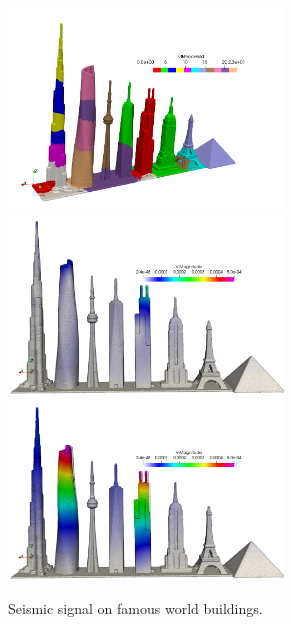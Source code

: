 \begin{figure}
	\centering
	\includegraphics[width=0.65\textwidth]{./Images/partitioned.png}        
	\includegraphics[width=0.65\textwidth]{./Images/frame0000.png}    
	\includegraphics[width=0.65\textwidth]{./Images/frame0080.png} 
	\caption{Seismic signal on famous world buildings.}
	\label{fig:buildings}
\end{figure}



